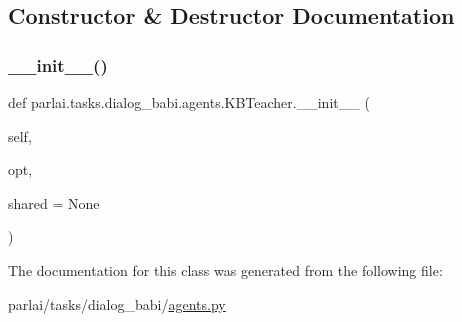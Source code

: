 \subsection{Constructor \& Destructor Documentation}
\mbox{\label{classparlai_1_1tasks_1_1dialog__babi_1_1agents_1_1KBTeacher_ac822ca7f017823413af0eebd531bee41}} 
\subsubsection{\texorpdfstring{\+\_\+\+\_\+init\+\_\+\+\_\+()}{\_\_init\_\_()}}
{\footnotesize\ttfamily def parlai.\+tasks.\+dialog\+\_\+babi.\+agents.\+K\+B\+Teacher.\+\_\+\+\_\+init\+\_\+\+\_\+ (\begin{DoxyParamCaption}\item[{}]{self,  }\item[{}]{opt,  }\item[{}]{shared = {\ttfamily None} }\end{DoxyParamCaption})}



The documentation for this class was generated from the following file\+:\begin{DoxyCompactItemize}
\item 
parlai/tasks/dialog\+\_\+babi/\hyperlink{parlai_2tasks_2dialog__babi_2agents_8py}{agents.\+py}\end{DoxyCompactItemize}
